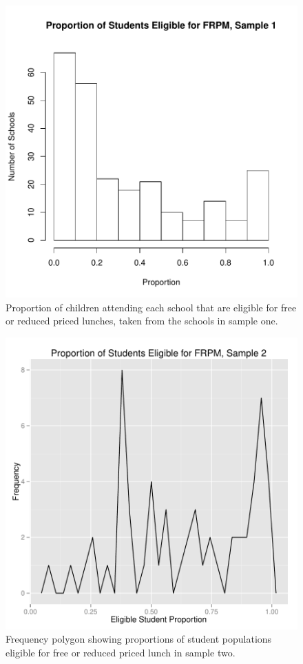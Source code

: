 \documentclass[twocolumn,english]{IEEEtran}
\theoremstyle{plain}
\theoremstyle{plain}
\begin{document}
\begin{figure}[H]
		\begin{centering}
\includegraphics{proj3-fig_lunch_props2}
		\caption{Proportion of children attending each school that are eligible for free or reduced priced lunches, taken from the schools in sample one.}
		\label{fig:Lunch_Hist_Two}
		\end{centering}
\end{figure}


\begin{figure}[H]
		\begin{centering}
\includegraphics{proj3-fig_lunch_props1}
		\caption{Frequency polygon showing proportions of student populations eligible for free or reduced priced lunch in sample two.}
		\label{fig:Lunch_Hist_One}
		\end{centering}
\end{figure}
\end{document}
